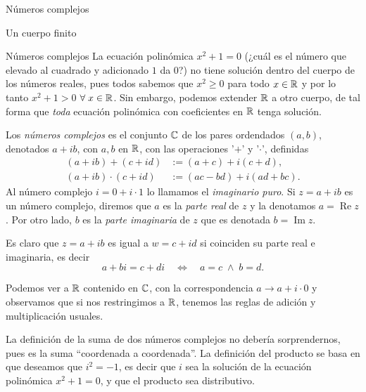 \begin{chapter}{N\'umeros complejos}
\begin{subsection}{Un cuerpo finito}
\begin{ejemplo*}
        \end{ejemplo*}
        
    \end{subsection}
    
    
    \begin{section}{N\'umeros complejos}\label{seccion-numeros-complejos}
        La ecuación polinómica $x^2 + 1 =0$ (¿cuál es el número que elevado  al cuadrado y adicionado $1$ da $0$?) no tiene solución dentro del cuerpo de los números reales,  pues todos sabemos que  $x^2 \ge 0$ para todo $x \in \mathbb R$ y por lo tanto $x^2 + 1 >0$ $\forall\; x \in \mathbb R$. Sin embargo, podemos extender $\mathbb R$ a otro cuerpo,  de tal forma que \textit{toda} ecuación polinómica con coeficientes en $\mathbb R$ tenga solución. 
        
        \begin{definicion} 
            Los \textit{números complejos} es el conjunto $\mathbb C$  de los pares ordendados $(a,b)$,  denotados $a+ib$, con $a, b$  en $\mathbb R$, con las operaciones '$+$' y '$\cdot$', definidas
            \begin{align}
            (a+ib)+ (c+id) &:= (a+c) + i(c+d), \label{sumacompleja} \\
            (a+ib) \cdot (c+id) &:= (ac -bd) + i(ad+bc). \label{productocomplejo}
            \end{align}
            Al número complejo $i = 0 + i\cdot 1$ lo llamamos el \textit{imaginario puro}.  Si $z= a + ib$  es un número complejo,  diremos que $a$ es la \textit{parte real} de $z$ y  la denotamos $a = \operatorname{Re} z$. Por otro lado,  $b$ es la \textit{parte  imaginaria} de $z$ que es denotada $b = \operatorname{Im} z$.
        \end{definicion}
        
        Es claro  que $z=a+ib$ es igual a $w = c+id$ si coinciden su parte real e imaginaria, es decir
        \begin{equation*}
        a+ bi = c+ di\quad \Leftrightarrow\quad a=c \;\wedge\; b = d.
        \end{equation*}
        
        Podemos  ver a $\mathbb R$ contenido en $\mathbb C$,  con la correspondencia $a \to a + i \cdot 0$ y  observamos que si  nos restringimos a $\mathbb R$, tenemos las reglas de adición y  multiplicación usuales.  
        
        La definición de la suma de dos números complejos no debería sorprendernos, pues es la suma ``coordenada a coordenada''. La definición del producto se basa en que deseamos que $i^2 = -1$,  es decir que $i$  sea la solución de la ecuación polinómica $x^2 + 1 =0$,   y que el producto sea distributivo. 	
        

\end{section}
\end{chapter}
